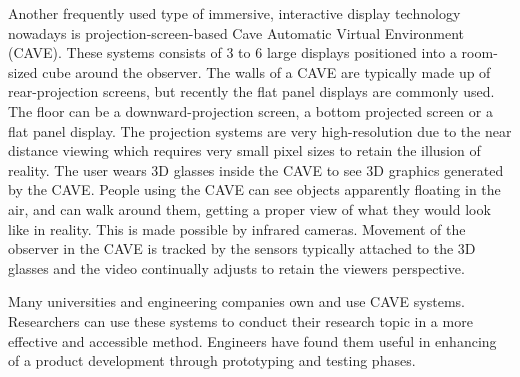 Another frequently used type of immersive, interactive display technology nowadays is projection-screen-based Cave Automatic Virtual Environment (CAVE). These systems consists of 3 to 6 large displays positioned into a room-sized cube around the observer. The walls of a CAVE are typically made up of rear-projection screens, but recently the flat panel displays are commonly used. The floor can be a downward-projection screen, a bottom projected screen or a flat panel display. The projection systems are very high-resolution due to the near distance viewing which requires very small pixel sizes to retain the illusion of reality. The user wears 3D glasses inside the CAVE to see 3D graphics generated by the CAVE. People using the CAVE can see objects apparently floating in the air, and can walk around them, getting a proper view of what they would look like in reality. This is made possible by infrared cameras. Movement of the observer in the CAVE is tracked by the sensors typically attached to the 3D glasses and the video continually adjusts to retain the viewers perspective.

Many universities and engineering companies own and use CAVE systems. Researchers can use these systems to conduct their research topic in a more effective and accessible method. Engineers have found them useful in enhancing of a product development through prototyping and testing phases.




%
%
%

